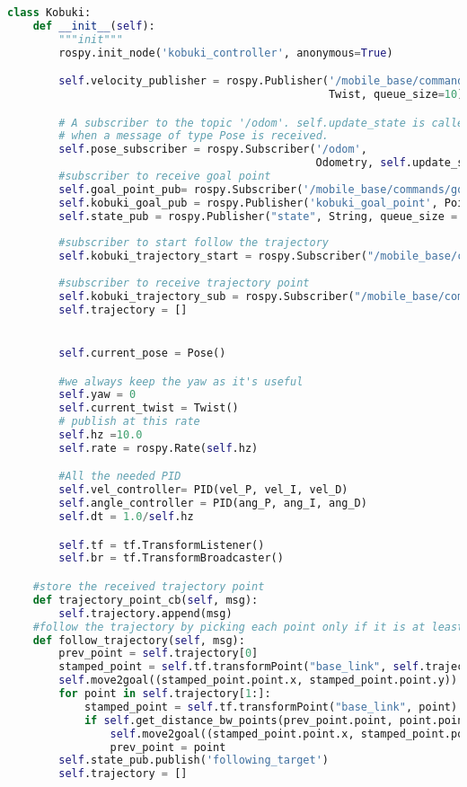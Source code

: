 \begin{lstlisting}[caption={Kobuki Class},label={lst:kobukiclass},language=Python]
class Kobuki:
    def __init__(self):
        """init"""
        rospy.init_node('kobuki_controller', anonymous=True)

        self.velocity_publisher = rospy.Publisher('/mobile_base/commands/velocity',
                                                  Twist, queue_size=10)

        # A subscriber to the topic '/odom'. self.update_state is called
        # when a message of type Pose is received.
        self.pose_subscriber = rospy.Subscriber('/odom',
                                                Odometry, self.update_state)
        #subscriber to receive goal point
        self.goal_point_pub= rospy.Subscriber('/mobile_base/commands/goal_point', PointStamped, self.goal_point_cb)
        self.kobuki_goal_pub = rospy.Publisher('kobuki_goal_point', PointStamped, queue_size=10)
        self.state_pub = rospy.Publisher("state", String, queue_size = 1)
        
        #subscriber to start follow the trajectory
        self.kobuki_trajectory_start = rospy.Subscriber("/mobile_base/commands/trajectory_start", Empty, self.follow_trajectory)
        
        #subscriber to receive trajectory point
        self.kobuki_trajectory_sub = rospy.Subscriber("/mobile_base/commands/trajectory_point", PointStamped, self.trajectory_point_cb)
        self.trajectory = []


        self.current_pose = Pose()

        #we always keep the yaw as it's useful
        self.yaw = 0
        self.current_twist = Twist()
        # publish at this rate
        self.hz =10.0
        self.rate = rospy.Rate(self.hz)

        #All the needed PID
        self.vel_controller= PID(vel_P, vel_I, vel_D)
        self.angle_controller = PID(ang_P, ang_I, ang_D)
        self.dt = 1.0/self.hz

        self.tf = tf.TransformListener()
        self.br = tf.TransformBroadcaster()

    #store the received trajectory point
    def trajectory_point_cb(self, msg):
        self.trajectory.append(msg)
    #follow the trajectory by picking each point only if it is at least at 20cm from the previous one
    def follow_trajectory(self, msg):
        prev_point = self.trajectory[0]
        stamped_point = self.tf.transformPoint("base_link", self.trajectory[0])
        self.move2goal((stamped_point.point.x, stamped_point.point.y))
        for point in self.trajectory[1:]:
            stamped_point = self.tf.transformPoint("base_link", point)
            if self.get_distance_bw_points(prev_point.point, point.point)>= 0.20:
                self.move2goal((stamped_point.point.x, stamped_point.point.y))
                prev_point = point
        self.state_pub.publish('following_target')
        self.trajectory = []


\end{lstlisting}
